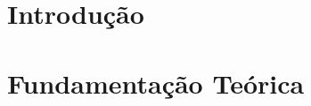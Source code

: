 \documentclass[
	12pt,				%
	oneside,
	a4paper,			%
	english,			%
	french,				%
	spanish,			%
	brazil				%
	]{abntex2}
\begin{document}
\tableofcontents*
\cleardoublepage



\textual

\chapter{Introdução}


\chapter{Fundamentação Teórica}



\end{document}
